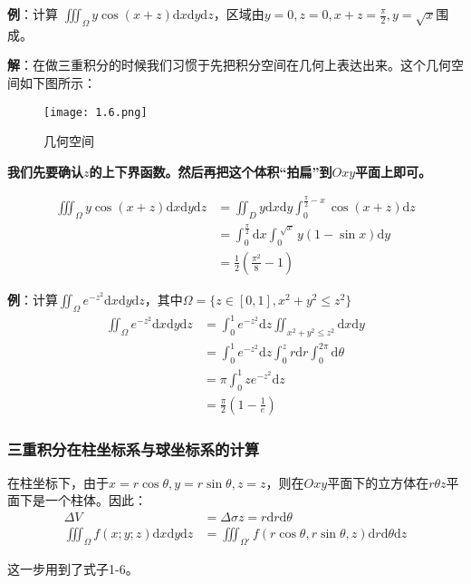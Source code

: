 \documentclass{ctexart}
\let\oldtextbf\textbf
\renewcommand{\textbf}[1]{\textcolor{brown!50!red}{\oldtextbf{#1}}}
\begin{document}
\textbf{\color{brown!50!red}例}：计算 $\iiint_\Omega y\cos(x+z)\mathrm{d}x\mathrm{d}y\mathrm{d}z$，区域由$y=0,z=0,x+z=\frac{\pi}{2},y=\sqrt{x}$围成。

\textbf{\color{brown!50!red}解}：在做三重积分的时候我们习惯于先把积分空间在几何上表达出来。这个几何空间如下图所示：
\begin{figure}[H]    
\centering     
\renewcommand{\figurename}{图}     
\renewcommand{\thefigure}{1.6}    
\begin{myimagebox}[width=0.45\textwidth] %
\texttt{[image: 1.6.png]} %
\end{myimagebox}     
\caption{\label{fig:1.6}几何空间}   
\end{figure}

\textbf{\color{brown!50!red}我们先要确认$z$的上下界函数。然后再把这个体积“拍扁”到$Oxy$平面上即可。}

\begin{align*}
  \iiint_\Omega y\cos(x+z)\mathrm{d}x\mathrm{d}y\mathrm{d}z&=\iint_D y\mathrm{d}x\mathrm{d}y
\int_0^{\frac{\pi}{2}-x}\cos(x+z)\mathrm{d}z\\  
&=\int_0^\frac{\pi}{2}\mathrm{d}x\int_0^{\sqrt[]{x}}y(1-\sin x)\mathrm{d}y\\
&=\frac{1}{2}\left( \frac{\pi^2}{8}-1  \right) 
\end{align*}

\textbf{\color{brown!50!red}例}：计算$\iint_\Omega e^{-z^2}\mathrm{d}x\mathrm{d}y\mathrm{d}z$，其中$\Omega=\{z\in[0,1],x^2+y^2\leq z^2\}$
\begin{align*}
    \iint_\Omega e^{-z^2}\mathrm{d}x\mathrm{d}y\mathrm{d}z&=\int_0^1e^{-z^2}\mathrm{d}z
\iint_{x^2+y^2\leq z^2}\mathrm{d}x\mathrm{d}y\\
  &=\int_0^1e^{-z^2}\mathrm{d}z\int_0^z r\mathrm{d}r\int_0^{2\pi}\mathrm{d}\theta 
\\&=\pi\int_0^1ze^{-z^2}\mathrm{d} z\\&=\frac{\pi}{2}(1-\frac{1}{e})   
\end{align*}

\subsubsection{三重积分在柱坐标系与球坐标系的计算}
\begin{tcolorbox}[
    colback=bac2,     %
    colframe=fra2,   %
    coltitle=white,             %
    coltext=tex2,
    title=三重积分的柱坐标系计算,
    fonttitle=\bfseries,        %
arc=3mm,                     %
breakable
]
在柱坐标下，由于$x=r\cos\theta,y=r\sin\theta,z=z$，则在$Oxy$平面下的立方体在$r\theta z$平面下是一个柱体。因此：
\begin{align*}
    \Delta V&=\Delta \sigma z=r\mathrm{d}r\mathrm{d}\theta\\
    \iiint_\Omega f(x;y;z)\mathrm{d}x\mathrm{d}y\mathrm{d}z&=\iiint_{\Omega'}f(r\cos\theta,r\sin\theta,z)\mathrm{d}r\mathrm{d}\theta\mathrm{d}z\tag{1-13}
\end{align*}

这一步用到了式子1-6。
\end{tcolorbox}
\end{document}
